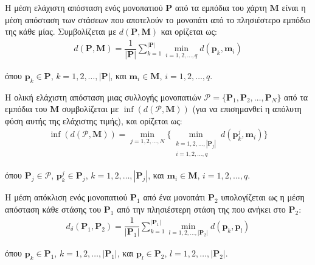 \begin{bw_box}
\begin{definition}
Η μέση ελάχιστη απόσταση ενός μονοπατιού $\bm{P}$ από τα εμπόδια του χάρτη
$\bm{M}$ είναι η μέση απόσταση των στάσεων που αποτελούν το μονοπάτι από το
πλησιέστερο εμπόδιο της κάθε μίας. Συμβολίζεται με $d(\bm{P},\bm{M})$ και
ορίζεται ως:
\begin{align}
  d(\bm{P},\bm{M}) = \dfrac{1}{|\bm{P}|} \sum\limits_{k=1}^{|\bm{P}|} \min\limits_{i=1,2,\dots,q} d(\bm{p}_k,\bm{m}_i)
  \label{eq:mean_min_obs_dist}
\end{align}

όπου $\bm{p}_k \in \bm{P}$, $k = 1,2,\dots,|\bm{P}|$, και
$\bm{m}_i \in \bm{M}$, $i = 1,2,\dots,q$.
\end{definition}
\end{bw_box}

\begin{bw_box}
\begin{definition}
Η ολική ελάχιστη απόσταση μιας συλλογής μονοπατιών
$\bm{\mathcal{P}} = \{ \bm{P}_1, \bm{P}_2, \dots, \bm{P}_N \}$ από τα εμπόδια
του $\bm{M}$ συμβολίζεται με $\inf(d(\bm{\mathcal{P}},\bm{M}))$ (για να
επισημανθεί η απόλυτη φύση αυτής της ελάχιστης τιμής), και ορίζεται ως:
\begin{align}
  \inf(d(\mathcal{P},\bm{M})) = \min\limits_{j=1,2,\dots,N} \big\{ \min\limits_{\substack{k=1,2,\dots, |\bm{P}_j| \\ i=1,2,\dots,q}} d(\bm{p}_k^j,\bm{m}_i) \big\}
  \label{eq:abs_min_obs_dist}
\end{align}

όπου $\bm{P}_j \in \mathcal{P}$, $\bm{p}_k^j \in \bm{P}_j$,
$k = 1,2,\dots,|\bm{P}_j|$, και $\bm{m}_i \in \bm{M}$, $i =1,2,\dots,q$.
\end{definition}
\end{bw_box}

\begin{bw_box}
\begin{definition}
Η μέση απόκλιση ενός μονοπατιού $\bm{P}_1$ από ένα μονοπάτι $\bm{P}_2$
υπολογίζεται ως η μέση απόσταση κάθε στάσης του $\bm{P}_1$ από την πλησιέστερη
στάση της που ανήκει στο $\bm{P}_2$:
\begin{align}
  d_{\delta}(\bm{P}_1,\bm{P}_2) = \dfrac{1}{|\bm{P}_1|} \sum\limits_{k=1}^{|\bm{P}_1|} \min\limits_{l=1,2,\dots,|\bm{P}_2|} d(\bm{p}_k, \bm{p}_l)
\end{align}

όπου $\bm{p}_k \in \bm{P}_1$, $k = 1,2,\dots,|\bm{P}_1|$, και
$\bm{p}_l \in \bm{P}_2$, $l = 1,2,\dots,|\bm{P}_2|$.
\end{definition}
\end{bw_box}

